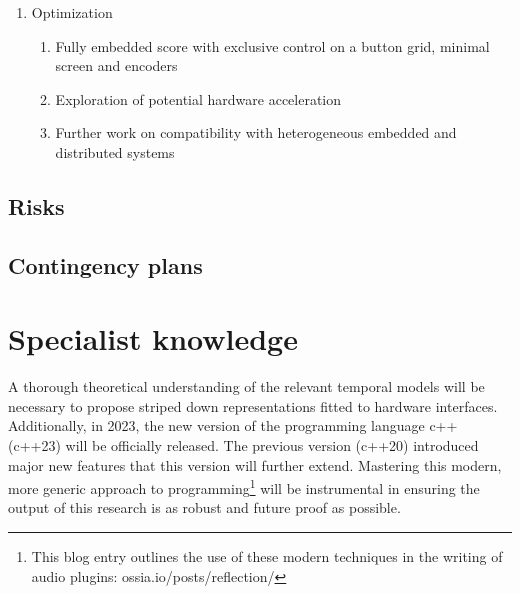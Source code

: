 \documentclass[journal,onecolumn]{IEEEtran}
\begin{document}
\begin{enumerate}
\begin{enumerate}
        \item States, events, intervals and transition creation, manipulation, deletion, copy and paste
        \item Process and device display and manipulation
        \item Trigger and condition manipulation (with logical expressions)
        \item Empress Zoya\footnote{empresseffects.com/products/zoia} style patching
    \end{enumerate}
    \item Optimization
    \begin{enumerate}
        \item Fully embedded score with exclusive control on a button grid, minimal screen and encoders
        \item Exploration of potential hardware acceleration
        \item Further work on compatibility with heterogeneous embedded and distributed systems
    \end{enumerate}
\end{enumerate}

\subsection{Risks}
\subsection{Contingency plans}

\section{Specialist knowledge} %
A thorough theoretical understanding of the relevant temporal models will be necessary to propose striped down representations fitted to hardware interfaces. 
Additionally, in 2023, the new version of the programming language c++ (c++23) will be officially released. The previous version (c++20) introduced major new features that this version will further extend. Mastering this modern, more generic approach to programming\footnote{This blog entry outlines  the use of these modern techniques in the writing of audio plugins: ossia.io/posts/reflection/} will be instrumental in ensuring the output of this research is as robust and future proof as possible. 
\end{document}
